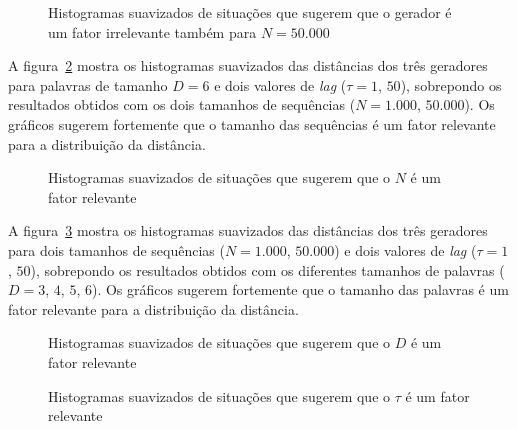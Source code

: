 \begin{figure} %
	\centering
		\caption{Histogramas suavizados de situações que sugerem que o gerador é um fator irrelevante também para $N=50.000$}\label{fig:GeradorIrrelevante50k}
\end{figure}

A figura~\ref{fig:NRelevante} mostra os histogramas suavizados das distâncias dos três geradores para palavras de tamanho $D=6$ e dois valores de \textit{lag} ($\tau=1$, $50$), sobrepondo os resultados obtidos com os dois tamanhos de sequências ($N=1.000$, $50.000$).
Os gráficos sugerem fortemente que o tamanho das sequências é um fator relevante para a distribuição da distância.

\begin{figure} %
	\centering
	\caption{Histogramas suavizados de situações que sugerem que o $N$ é um fator relevante}\label{fig:NRelevante}
\end{figure}

A figura~\ref{fig:DRelevante} mostra os histogramas suavizados das distâncias dos três geradores para dois tamanhos de sequências ($N=1.000$, $50.000$) e dois valores de \textit{lag} ($\tau=1$, $50$), sobrepondo os resultados obtidos com os diferentes tamanhos de palavras ($D=3$, $4$, $5$, $6$).
Os gráficos sugerem fortemente que o tamanho das palavras é um fator relevante para a distribuição da distância.

\begin{figure} %
	\centering
	\caption{Histogramas suavizados de situações que sugerem que o $D$ é um fator relevante}\label{fig:DRelevante}
\end{figure}



\begin{figure} %
	\centering
\caption{Histogramas suavizados de situações que sugerem que o $\tau$ é um fator relevante}\label{fig:tRelevante}
\end{figure}

